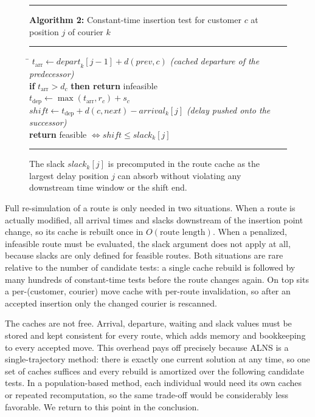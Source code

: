 \documentclass[10pt, a4paper]{article}
\begin{document}
\begin{figure}[t]
\small
\hrule\vspace{2pt}
\textbf{Algorithm 2:} Constant-time insertion test for customer $c$ at
position $j$ of courier $k$
\vspace{2pt}\hrule\vspace{4pt}
\begin{tabbing}
\hspace{1.2em}\=\kill
$t_{\text{arr}} \leftarrow \mathit{depart}_k[j-1] + d(\mathit{prev}, c)$
\quad\emph{(cached departure of the predecessor)}\\
\textbf{if} $t_{\text{arr}} > d_c$ \textbf{then return} infeasible\\
$t_{\text{dep}} \leftarrow \max(t_{\text{arr}}, r_c) + s_c$\\
$\mathit{shift} \leftarrow t_{\text{dep}} + d(c, \mathit{next}) -
\mathit{arrival}_k[j]$
\quad\emph{(delay pushed onto the successor)}\\
\textbf{return} feasible $\iff \mathit{shift} \le \mathit{slack}_k[j]$
\end{tabbing}
\vspace{2pt}\hrule
\caption{The slack $\mathit{slack}_k[j]$ is precomputed in the route cache
as the largest delay position $j$ can absorb without violating any
downstream time window or the shift end.}
\label{alg:slack}
\end{figure}

Full re-simulation of a route is only needed in two situations. When a
route is actually modified, all arrival times and slacks downstream of the
insertion point change, so its cache is rebuilt once in
$O(\text{route length})$. When a penalized, infeasible route must be
evaluated, the slack argument does not apply at all, because slacks are
only defined for feasible routes. Both situations are rare relative to the
number of candidate tests: a single cache rebuild is followed by many
hundreds of constant-time tests before the route changes again. On top
sits a per-(customer, courier) move cache with per-route invalidation, so
after an accepted insertion only the changed courier is rescanned.

The caches are not free. Arrival, departure, waiting and slack values must
be stored and kept consistent for every route, which adds memory and
bookkeeping to every accepted move. This overhead pays off precisely
because ALNS is a single-trajectory method: there is exactly one current
solution at any time, so one set of caches suffices and every rebuild is
amortized over the following candidate tests. In a population-based
method, each individual would need its own caches or repeated
recomputation, so the same trade-off would be considerably less favorable.
We return to this point in the conclusion.
\end{document}
